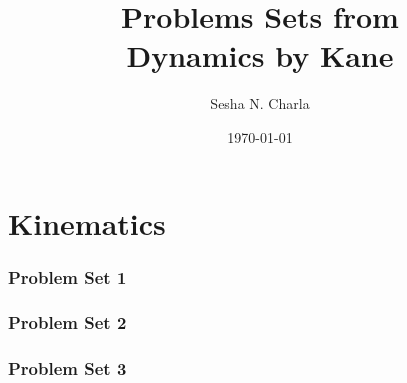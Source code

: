\documentclass[letterpaper, 11pt]{article}
\title{Problems Sets from\\Dynamics by Kane}
\author{Sesha N. Charla}
\date{\today}
\begin{document}
\maketitle
\tableofcontents
\newpage
\part{Kinematics}
\section{Problem Set 1}








\newpage
\section{Problem Set 2}









\newpage
\section{Problem Set 3}












\newpage
\end{document}
